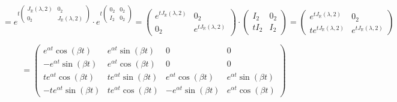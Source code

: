 \[
        = e^{t \begin{pmatrix}
            J_{\mathbb{R}}(\lambda, 2) & 0_2 \\
            0_2 & J_{\mathbb{R}}(\lambda, 2)
            \end{pmatrix}} \cdot e^{t \begin{pmatrix}
            0_2 & 0_2 \\
            I_2 & 0_2
            \end{pmatrix}} = \begin{pmatrix}
                e^{t J_{\mathbb{R}}(\lambda, 2)} & 0_2 \\
                0_2 & e^{t J_{\mathbb{R}}(\lambda, 2)}
            \end{pmatrix} \cdot \begin{pmatrix}
                I_2 & 0_2 \\
                t I_2 & I_2
            \end{pmatrix} = \begin{pmatrix}
                e^{t J_{\mathbb{R}}(\lambda, 2)} &
                0_2 \\
                t e^{t J_{\mathbb{R}}(\lambda, 2)} & e^{t J_{\mathbb{R}}(\lambda, 2)}
            \end{pmatrix}
\]

\[
        = \begin{pmatrix}
            e^{\alpha t} \cos(\beta t) & e^{\alpha t} \sin(\beta t) & 0 & 0 \\
            -e^{\alpha t} \sin(\beta t) & e^{\alpha t} \cos(\beta t) & 0 & 0 \\
            t e^{\alpha t} \cos(\beta t) & t e^{\alpha t} \sin(\beta t) & e^{\alpha t} \cos(\beta t) & e^{\alpha t} \sin(\beta t) \\
            -t e^{\alpha t} \sin(\beta t) & t e^{\alpha t} \cos(\beta t) & -e^{\alpha t} \sin(\beta t) & e^{\alpha t} \cos(\beta t)
        \end{pmatrix}
\]


